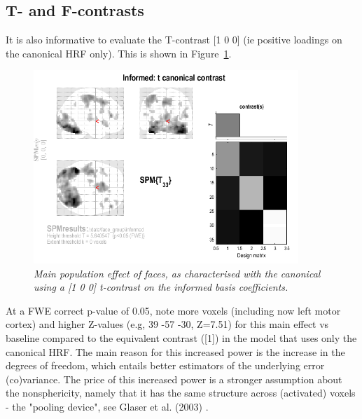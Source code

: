 \subsection{T- and F-contrasts}

	It is also informative to evaluate the T-contrast [1 0 0] (ie positive loadings on the canonical HRF only). This is 
	shown in Figure~\ref{informed_t}.
	\begin{figure}
\begin{center}
\includegraphics[width=100mm]{faces_group/informed_t}
\caption{\em Main population effect of faces, as characterised with the canonical using a [1 0 0] t-contrast on the informed basis coefficients. \label{informed_t}}
\end{center}
\end{figure}
At a FWE correct p-value of 0.05, note more voxels (including now left motor cortex) and higher Z-values (e.g, 39 -57 -30, Z=7.51) for this main effect vs baseline compared to the equivalent contrast ([1]) in the model that uses only the canonical HRF. 
The main reason for this increased power is the increase in the degrees of freedom, which entails better estimators of the underlying error (co)variance. The price of this increased power is a stronger assumption about the nonsphericity, namely that it has the same structure across (activated) voxels - the "pooling device", see Glaser et al. (2003) \cite{daniel_hbf2}.

